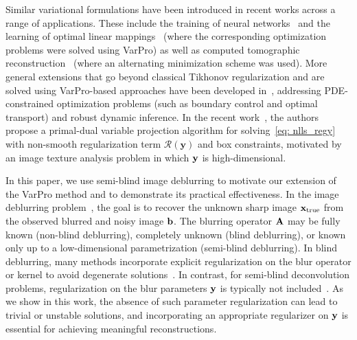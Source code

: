 \documentclass[onefignum,onetabnum]{siamart171218}
\newcommand{\bA}{{\bf A}}
\newcommand{\bb}{{\bf b}}
\newcommand{\bx}{{\bf x}}
\newcommand{\by}{{\bf y}}
\begin{document}
Similar variational formulations have been introduced in recent works across a range of applications. These include the training of neural networks~\cite{newman2021train} and the learning of optimal linear mappings~\cite{newman2025optimal} (where the corresponding optimization problems were solved using VarPro) as well as computed tomographic reconstruction~\cite{uribe2022hybrid} (where an alternating minimization scheme was used). More general extensions that go beyond classical Tikhonov regularization and are solved using VarPro-based approaches have been developed in~\cite{aravkin2017efficient, van2021variable}, addressing PDE-constrained optimization problems (such as boundary control and optimal transport) and robust dynamic inference. In the recent work~\cite{marmin2025varprox}, the authors propose a primal-dual variable projection algorithm for solving~\eqref{eq: nlls_regy} with non-smooth regularization term $\mathcal{R}(\mathbf{y})$ and box constraints, motivated by an image texture analysis problem in which $\by$ is high-dimensional.

In this paper, we use semi-blind image deblurring to motivate our extension of the VarPro method and to demonstrate its practical effectiveness. In the image deblurring problem~\cite{austin2022image, espanol2009multilevel, deblurring}, the goal is to recover the unknown sharp image $\bx_{\rm true}$ from the observed blurred and noisy image $\bb$. The blurring operator $\bA$ may be fully known (non-blind deblurring), completely unknown (blind deblurring), or known only up to a low-dimensional parametrization (semi-blind deblurring). In blind deblurring, many methods incorporate explicit regularization on the blur operator or kernel to avoid degenerate solutions~\cite{chan1998total, dykes2021lanczos, levin2009understanding}. In contrast, for semi-blind deconvolution problems, regularization on the blur parameters $\by$ is typically not included~\cite{buccini2018semiblind, chung2010efficient, cornelio2014constrained, espanol2025local, Espanol_2023, gazzola2021regularization}. As we show in this work, the absence of such parameter regularization can lead to trivial or unstable solutions, and incorporating an appropriate regularizer on $\by$ is essential for achieving meaningful reconstructions.
\end{document}
